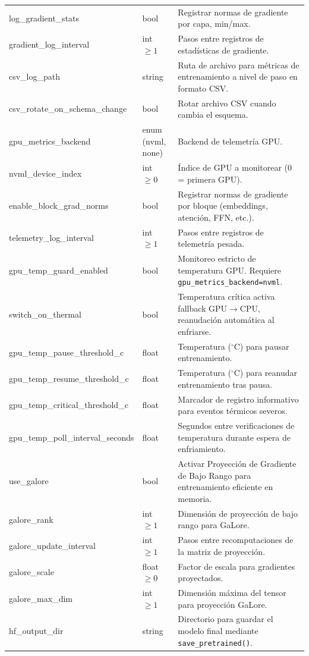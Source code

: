 \begin{longtable}{>{\ttfamily}l>{\raggedright\arraybackslash}p{3.5cm}>{\raggedright\arraybackslash}p{8.5cm}}
log\_gradient\_stats & bool & Registrar normas de gradiente por capa, min/max. \\
gradient\_log\_interval & int $\ge 1$ & Pasos entre registros de estadísticas de gradiente. \\
csv\_log\_path & string & Ruta de archivo para métricas de entrenamiento a nivel de paso en formato CSV. \\
csv\_rotate\_on\_schema\_change & bool & Rotar archivo CSV cuando cambia el esquema. \\
gpu\_metrics\_backend & enum (nvml, none) & Backend de telemetría GPU. \\
nvml\_device\_index & int $\ge 0$ & Índice de GPU a monitorear (0 = primera GPU). \\
enable\_block\_grad\_norms & bool & Registrar normas de gradiente por bloque (embeddings, atención, FFN, etc.). \\
telemetry\_log\_interval & int $\ge 1$ & Pasos entre registros de telemetría pesada. \\
gpu\_temp\_guard\_enabled & bool & Monitoreo estricto de temperatura GPU. Requiere \texttt{gpu\_metrics\_backend=nvml}. \\
switch\_on\_thermal & bool & Temperatura crítica activa fallback GPU$\to$CPU, reanudación automática al enfriarse. \\
gpu\_temp\_pause\_threshold\_c & float & Temperatura ($^\circ$C) para pausar entrenamiento. \\
gpu\_temp\_resume\_threshold\_c & float & Temperatura ($^\circ$C) para reanudar entrenamiento tras pausa. \\
gpu\_temp\_critical\_threshold\_c & float & Marcador de registro informativo para eventos térmicos severos. \\
gpu\_temp\_poll\_interval\_seconds & float & Segundos entre verificaciones de temperatura durante espera de enfriamiento. \\
use\_galore & bool & Activar Proyección de Gradiente de Bajo Rango para entrenamiento eficiente en memoria. \\
galore\_rank & int $\ge 1$ & Dimensión de proyección de bajo rango para GaLore. \\
galore\_update\_interval & int $\ge 1$ & Pasos entre recomputaciones de la matriz de proyección. \\
galore\_scale & float $\ge 0$ & Factor de escala para gradientes proyectados. \\
galore\_max\_dim & int $\ge 1$ & Dimensión máxima del tensor para proyección GaLore. \\
hf\_output\_dir & string & Directorio para guardar el modelo final mediante \texttt{save\_pretrained()}. \\
\end{longtable}

